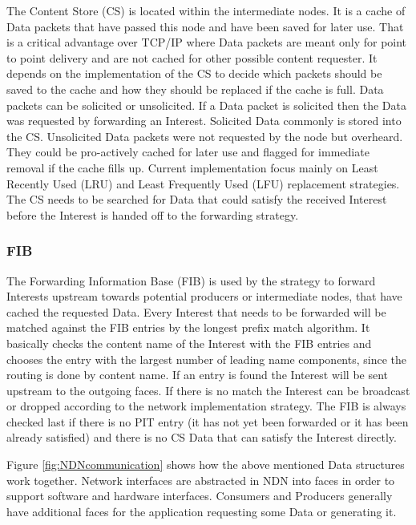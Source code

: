 The Content Store (CS) is located within the intermediate nodes. It is a cache of Data packets that have passed this node and have been saved for later use. That is a critical advantage over TCP/IP where Data packets are meant only for point to point delivery and are not cached for other possible content requester. It depends on the implementation of the CS to decide which packets should be saved to the cache and how they should be replaced if the cache is full. Data packets can be solicited or unsolicited. If a Data packet is solicited then the Data was requested by forwarding an Interest. Solicited Data commonly is stored into the CS. Unsolicited Data packets were not requested by the node but overheard. They could be pro-actively cached for later use and flagged for immediate removal if the cache fills up. Current implementation focus mainly on Least Recently Used (LRU) and Least Frequently Used (LFU) replacement strategies. The CS needs to be searched for Data that could satisfy the received Interest before the Interest is handed off to the forwarding strategy.

\subsubsection{FIB}

The Forwarding Information Base (FIB) is used by the strategy to forward Interests upstream towards potential producers or intermediate nodes, that have cached the requested Data. Every Interest that needs to be forwarded will be matched against the FIB entries by the longest prefix match algorithm. It basically checks the content name of the Interest with the FIB entries and chooses the entry with the largest number of leading name components, since the routing is done by content name. If an entry is found the Interest will be sent upstream to the outgoing faces. If there is no match the Interest can be broadcast or dropped according to the network implementation strategy. The FIB is always checked last if there is no PIT entry (it has not yet been forwarded or it has been already satisfied) and there is no CS Data that can satisfy the Interest directly.

Figure \ref{fig:NDNcommunication} shows how the above mentioned Data structures work together. Network interfaces are abstracted in NDN into faces in order to support software and hardware interfaces. Consumers and Producers generally have additional faces for the application requesting some Data or generating it.

